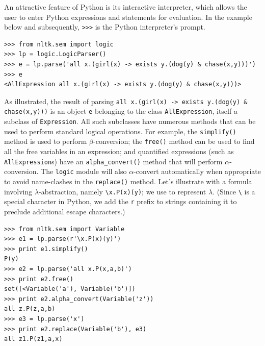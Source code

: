\documentclass[11pt,a4paper]{article}
\newcommand{\dhgcode}[1]{{\tt #1}}
\begin{document}



An attractive feature of Python is its interactive interpreter,
which allows the user to enter Python expressions and statements for
evaluation. In the example below and subsequently, \verb!>>>! is the
Python interpreter's prompt. 
\begin{verbatim}
>>> from nltk.sem import logic
>>> lp = logic.LogicParser()
>>> e = lp.parse('all x.(girl(x) -> exists y.(dog(y) & chase(x,y)))')
>>> e
<AllExpression all x.(girl(x) -> exists y.(dog(y) & chase(x,y)))>
\end{verbatim}
As illustrated, the result of parsing
\verb!all x.(girl(x) -> exists y.(dog(y) & chase(x,y)))! is an object
\texttt{e} belonging to the class \texttt{AllExpression}, itself a
subclass of \texttt{Expression}.  All such subclasses have numerous
methods that can be used to perform standard logical operations. For
example, the \dhgcode{simplify()} method is used to perform
$\beta$-conversion; the \dhgcode{free()} method can be used to find
all the free variables in an expression; and quantified expressions
(such as \texttt{AllExpression}s) have an \dhgcode{alpha\_convert()}
method that will perform $\alpha$-conversion.  The \texttt{logic}
module will also $\alpha$-convert automatically when appropriate to
avoid name-clashes in the \dhgcode{replace()} method. Let's illustrate
with a formula involving $\lambda$-abstraction, namely
\verb!\x.P(x)(y)!; we use \protect{\verb!\!} to represent
$\lambda$. (Since \verb!\! is a special character in Python,
we add the \texttt{r} prefix to strings containing it to preclude
additional escape characters.)

\begin{verbatim}
>>> from nltk.sem import Variable
>>> e1 = lp.parse(r'\x.P(x)(y)')
>>> print e1.simplify()
P(y)
>>> e2 = lp.parse('all x.P(x,a,b)')
>>> print e2.free()
set([<Variable('a'), Variable('b')])
>>> print e2.alpha_convert(Variable('z'))
all z.P(z,a,b)
>>> e3 = lp.parse('x')
>>> print e2.replace(Variable('b'), e3)
all z1.P(z1,a,x)
\end{verbatim}
\end{document}
